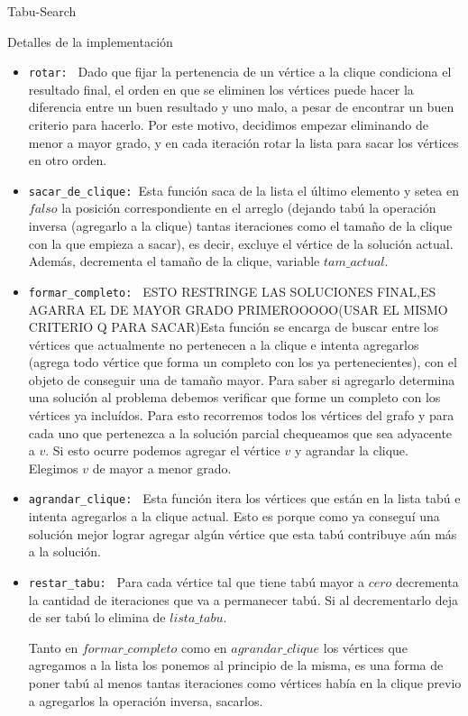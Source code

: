 \begin{section}{Tabu-Search}
\begin{subsection}{Detalles de la implementación}
		\begin{itemize}			
			\item \texttt{rotar: } Dado que fijar la pertenencia de un vértice a la clique condiciona el resultado final, el orden en que se eliminen los vértices puede hacer la diferencia entre un buen resultado y uno malo, a pesar de encontrar un buen criterio para hacerlo. Por este motivo, decidimos empezar eliminando de menor a mayor grado, y en cada iteración rotar la lista para sacar los vértices en otro orden.
			
			\item \texttt{sacar\_de\_clique: }Esta función saca de la lista el último elemento y setea en $falso$ la posición correspondiente en el arreglo (dejando tabú la operación inversa (agregarlo a la clique) tantas iteraciones como el tamaño de la clique con la que empieza a sacar), es decir, excluye el vértice de la solución actual. Además, decrementa el tamaño de la clique, variable $tam\_actual$.
			
			\item \texttt{formar\_completo: } ESTO RESTRINGE LAS SOLUCIONES FINAL,ES AGARRA EL DE MAYOR GRADO PRIMEROOOOO(USAR EL MISMO CRITERIO Q PARA SACAR)Esta función se encarga de buscar entre los vértices que actualmente no pertenecen a la clique e intenta agregarlos (agrega todo vértice que forma un completo con los ya pertenecientes), con el objeto de conseguir una de tamaño mayor. Para saber si agregarlo determina una solución al problema debemos verificar que forme un completo con los vértices ya incluídos. Para esto recorremos todos los vértices del grafo y para cada uno que pertenezca a la solución parcial chequeamos que sea adyacente a $v$. Si esto ocurre podemos agregar el vértice $v$ y agrandar la clique. Elegimos $v$ de mayor a menor grado.

			\item \texttt{agrandar\_clique: } Esta función itera los vértices que están en la lista tabú e intenta agregarlos a la clique actual. Esto es porque como ya conseguí una solución mejor lograr agregar algún vértice que esta tabú contribuye aún más a la solución.

			\item \texttt{restar\_tabu: } Para cada vértice tal que tiene tabú mayor a $cero$ decrementa la cantidad de iteraciones que va a permanecer tabú. Si al decrementarlo deja de ser tabú lo elimina de $lista\_tabu$.

			Tanto en $formar\_completo$ como en $agrandar\_clique$ los vértices que agregamos a la lista los ponemos al principio de la misma, es una forma de poner tabú al menos tantas iteraciones como vértices había en la clique previo a agregarlos la operación inversa, sacarlos.
		\end{itemize}
	\end{subsection}


\end{section}
